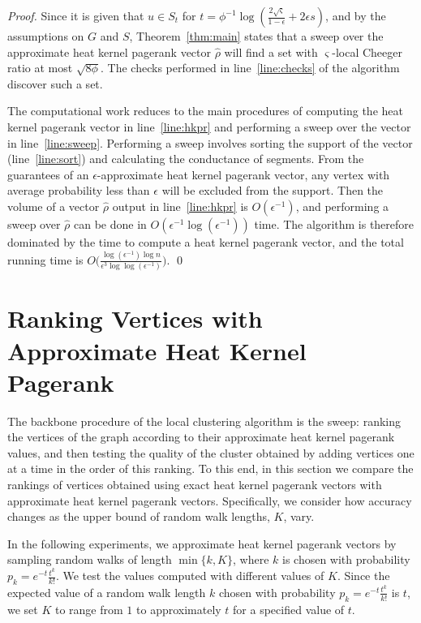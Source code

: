 \documentclass[runningheads,a4paper]{llncs}
\newcommand{\hkprcomplexity}{O\big(\frac{\log(\epsilon^{-1})\log n}{\epsilon^3\log\log(\epsilon^{-1})}\big)}
\newcommand{\tparamcluster}{\phi^{-1}\log(\frac{2\sqrt{\varsigma}}{1-\epsilon} + 2\epsilon s)}
\begin{document}
\begin{proof}
Since it is given that $u\in S_t$ for $t=\tparamcluster$, and by the assumptions
on $G$ and $S$, Theorem~\ref{thm:main} states that a sweep over the approximate
heat kernel pagerank vector $\hat{\rho}$ will find a set with $\varsigma$-local
Cheeger ratio at most $\sqrt{8\phi}$.  The checks performed in
line~\ref{line:checks} of the algorithm discover such a set.

The computational work reduces to the main procedures of computing the heat
kernel pagerank vector in line~\ref{line:hkpr} and performing a sweep over the
vector in line~\ref{line:sweep}.  Performing a sweep involves sorting the
support of the vector (line~\ref{line:sort}) and calculating the conductance of
segments.  From the guarantees of an $\epsilon$-approximate heat kernel pagerank
vector, any vertex with average probability less than $\epsilon$ will be
excluded from the support.  Then the volume of a vector $\hat{\rho}$ output in
line~\ref{line:hkpr} is $O(\epsilon^{-1})$, and performing a sweep over
$\hat{\rho}$ can be done in $O(\epsilon^{-1}\log(\epsilon^{-1}))$ time.  The
algorithm is therefore dominated by the time to compute a heat kernel pagerank
vector, and the total running time is $\hkprcomplexity$.
\qed\end{proof}


\section{Ranking Vertices with Approximate Heat Kernel Pagerank}
\label{sec:rankings}
The backbone procedure of the local clustering algorithm is the sweep: ranking
the vertices of the graph according to their approximate heat kernel pagerank
values, and then testing the quality of the cluster obtained by adding vertices
one at a time in the order of this ranking.  To this end, in this section we
compare the rankings of vertices obtained using exact heat kernel pagerank
vectors with approximate heat kernel pagerank vectors.  Specifically, we
consider how accuracy changes as the upper bound of random walk lengths, $K$,
vary.

In the following experiments, we approximate heat kernel pagerank vectors by
sampling random walks of length $\min\{k, K\}$, where $k$ is chosen with
probability $p_k = e^{-t}\frac{t^k}{k!}$.  We test the values computed with
different values of $K$.  Since the expected value of a random walk length $k$
chosen with probability $p_k = e^{-t}\frac{t^k}{k!}$ is $t$, we set $K$ to range
from $1$ to approximately $t$ for a specified value of $t$.
\end{document}
